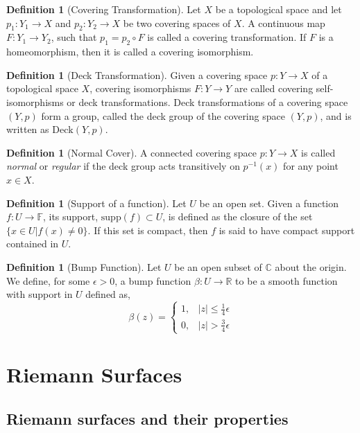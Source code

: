 \documentclass[11pt]{report}
\theoremstyle{definition}
\newtheorem{defn}[thm]{Definition}
\begin{document}
\begin{defn}[Covering Transformation]
  Let $X$ be a topological space and let $p_1:Y_1 \rightarrow X$ and $p_2:Y_2 \rightarrow X$ be two covering spaces of $X$. A continuous map $F:Y_1 \rightarrow Y_2$, such that $p_1 = p_2 \circ F$ is called a covering transformation. If $F$ is a homeomorphism, then it is called a covering isomorphism.
\end{defn}
\begin{defn}[Deck Transformation]
  Given a covering space $p:Y \rightarrow X$ of a topological space $X$,  covering isomorphisms $F:Y \rightarrow Y$ are called covering self-isomorphisms or deck transformations. Deck transformations of a covering space $(Y,p)$ form a group, called the deck group of the covering space $(Y,p)$, and is written as $\text{Deck}(Y,p)$.
\end{defn}
\begin{defn}[Normal Cover]
A connected covering space $p:Y \rightarrow X$ is called \emph{normal} or \emph{regular} if the deck group acts transitively on $p^{-1}(x)$ for any point $x \in X$.
\end{defn}

\begin{defn}[Support of a function]
Let $U$ be an open set. Given a function $f: U \rightarrow \mathbb{F}$, its support, $\text{supp}(f) \subset U$, is defined as the closure of the set $\{x \in U \vert f(x)\neq 0\}$. If this set is compact, then $f$ is said to have compact support contained in $U$.
\end{defn}
\begin{defn}[Bump Function]
  Let $U$ be an open subset of $\mathbb{C}$ about the origin. We define, for some $\epsilon > 0$, a bump function $\beta: U \rightarrow \mathbb{R}$ to be a smooth function with support in $U$ defined as,
  \[
    \beta(z)=
    \begin{cases}
      1, &|z| \leq \frac{1}{4}\epsilon \\
      0, &|z| > \frac{3}{4}\epsilon
    \end{cases}
  \]
\end{defn}
\chapter{Riemann Surfaces}\label{RSChapter}
\section{Riemann surfaces and their properties}\label{bdefns}
\end{document}
